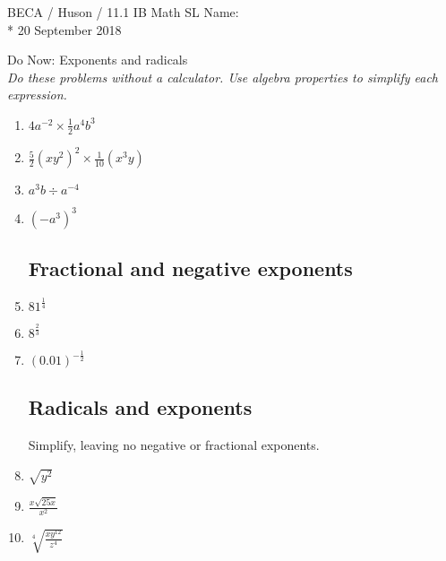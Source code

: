 \documentclass[]{book}
\begin{document}
\noindent BECA / Huson / 11.1 IB Math SL \hspace{2in} Name:\\*
20 September 2018
\begin{center}
{\Large Do Now: Exponents and radicals}\\
\textit{Do these problems without a calculator. Use algebra properties to simplify each expression.}
\end{center}


\begin{enumerate}

\subsection*{Exponent rules}

\item $\displaystyle 4a^{-2} \times \frac{1}{2}a^4 b^3$\\[10pt]
\item $\displaystyle \frac{5}{2} (x y^2)^2 \times \frac{1}{10}(x^3y)$\\[10pt]
\item $a^3 b \div a^{-4}$\\[10pt]
\item $(-a^3)^3$\\[10pt]

\subsection*{Fractional and negative exponents}

\item $\displaystyle  81^\frac{1}{4}$\\[10pt]
\item $\displaystyle  8^\frac{2}{3}$\\[10pt]
\item $\displaystyle  (0.01)^{-\frac{1}{2}}$\\[10pt]

\subsection*{Radicals and exponents}
Simplify, leaving no negative or fractional exponents.

\item $\sqrt{y^2}$\\[10pt]
\item $\displaystyle  \frac{x \sqrt{25x}}{x^{2}}$\\[10pt]
\item $\displaystyle  \sqrt[4]{\frac{x y^{12}}{z^{4}}}$\\[10pt]





\end{enumerate}
\end{document}
